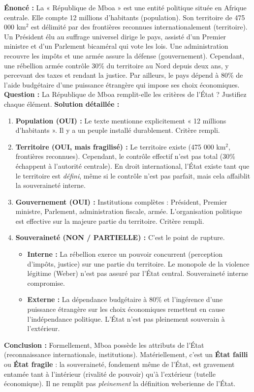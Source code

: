 \documentclass[11pt]{article}
\begin{document}
\begin{exoresolu}
\textbf{Énoncé :} La « République de Mboa » est une entité politique située en Afrique centrale. Elle compte 12 millions d'habitants (population). Son territoire de 475 000 km$^2$ est délimité par des frontières reconnues internationalement (territoire). Un Président élu au suffrage universel dirige le pays, assisté d'un Premier ministre et d'un Parlement bicaméral qui vote les lois. Une administration recouvre les impôts et une armée assure la défense (gouvernement). Cependant, une rébellion armée contrôle 30\% du territoire au Nord depuis deux ans, y percevant des taxes et rendant la justice. Par ailleurs, le pays dépend à 80\% de l'aide budgétaire d'une puissance étrangère qui impose ses choix économiques.
\textbf{Question :} La République de Mboa remplit-elle les critères de l'État ? Justifiez chaque élément.
\tcblower
\textbf{Solution détaillée :}
\begin{enumerate}
    \item \textbf{Population (OUI) :} Le texte mentionne explicitement « 12 millions d'habitants ». Il y a un peuple installé durablement. Critère rempli.
    \item \textbf{Territoire (OUI, mais fragilisé) :} Le territoire existe (475 000 km$^2$, frontières reconnues). Cependant, le contrôle effectif n'est pas total (30\% échappent à l'autorité centrale). En droit international, l'État existe tant que le territoire est \emph{défini}, même si le contrôle n'est pas parfait, mais cela affaiblit la souveraineté interne.
    \item \textbf{Gouvernement (OUI) :} Institutions complètes : Président, Premier ministre, Parlement, administration fiscale, armée. L'organisation politique est effective sur la majeure partie du territoire. Critère rempli.
    \item \textbf{Souveraineté (NON / PARTIELLE) :} C'est le point de rupture.
    \begin{itemize}
        \item \textbf{Interne :} La rébellion exerce un pouvoir concurrent (perception d'impôts, justice) sur une partie du territoire. Le monopole de la violence légitime (Weber) n'est pas assuré par l'État central. Souveraineté interne compromise.
        \item \textbf{Externe :} La dépendance budgétaire à 80\% et l'ingérence d'une puissance étrangère sur les choix économiques remettent en cause l'indépendance politique. L'État n'est pas pleinement souverain à l'extérieur.
    \end{itemize}
\end{enumerate}
\textbf{Conclusion :} Formellement, Mboa possède les attributs de l'État (reconnaissance internationale, institutions). Matériellement, c'est un \textbf{État failli} ou \textbf{État fragile} : la souveraineté, fondement même de l'État, est gravement entamée tant à l'intérieur (rivalité de pouvoir) qu'à l'extérieur (tutelle économique). Il ne remplit pas \emph{pleinement} la définition weberienne de l'État.
\end{exoresolu}
\end{document}
